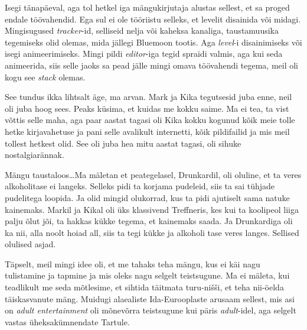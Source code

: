 
Isegi tänapäeval, aga tol hetkel iga mängukirjutaja alustas sellest, et sa proged endale töövahendid. Ega sul ei ole tööriistu selleks, et levelit disainida või midagi. Mingisugused \emph{tracker}-id, selliseid nelja või kaheksa kanaliga, taustamuusika tegemiseks olid olemas, mida jällegi Bluemoon tootis. Aga \emph{level}-i disainimiseks või isegi animeerimiseks. Mingi pildi \emph{editor}-iga tegid spraidi valmis, aga kui seda animeerida, siis selle jaoks sa pead jälle mingi omava töövahendi tegema, meil oli kogu see \emph{stack} olemas.


See tundus ikka lihtsalt äge, ma arvan. Mark ja Kika tegutsesid juba enne, neil oli juba hoog sees. Peaks küsima, et kuidas me kokku saime. Ma ei tea, ta vist võttis selle maha, aga paar aastat tagasi oli Kika kokku kogunud kõik meie tolle hetke kirjavahetuse ja pani selle avalikult internetti, kõik  pildifailid ja mis meil tollest hetkest olid. See oli juba hea mitu aastat tagasi, oli  sihuke nostalgiarännak. 

Mängu taustaloos\ldots Ma mäletan et peategelasel, Drunkardil, oli oluline, et ta veres alkoholitase ei langeks. Selleks pidi ta korjama pudeleid, siis ta sai tühjade pudelitega loopida. Ja olid mingid olukorrad, kus ta pidi ajutiselt sama natuke kainemaks. Markil ja Kikal oli üks klassivend Treffneris, kes kui ta koolipeol liiga palju õlut jõi, ta hakkas kükke tegema, et kainemaks saada. Ja Drunkardiga oli ka nii, alla noolt hoiad all, siis ta tegi kükke ja alkoholi tase veres langes. Sellised olulised asjad.


Täpselt, meil mingi idee oli, et me tahaks teha mängu, kus ei käi nagu tulistamine ja tapmine ja mis oleks nagu selgelt teistsugune. Ma ei mäleta, kui teadlikult me seda mõtlesime, et sihtida täitmata turu-nišši, et teha nii-öelda täiskasvanute mäng. Muidugi alaealiste Ida-Eurooplaste arusaam sellest, mis asi on \emph{adult entertainment} oli mõnevõrra teistsugune kui päris \emph{adult}-idel, aga selgelt vastas üheksakümnendate Tartule.

